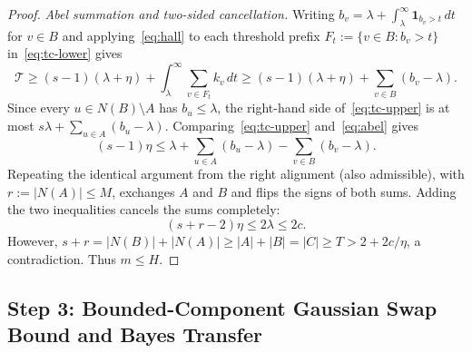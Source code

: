 \documentclass[11pt]{article}
\theoremstyle{plain}
\theoremstyle{definition}
\theoremstyle{remark}
\begin{document}
\begin{proof}
\emph{Abel summation and two-sided cancellation.}
Writing $b_v = \lambda + \int_\lambda^\infty \mathbf{1}_{b_v > t}\,dt$ for $v \in B$ and applying~\eqref{eq:hall} to each threshold prefix $F_t := \{v \in B : b_v > t\}$ in~\eqref{eq:tc-lower} gives
\begin{equation}\label{eq:abel}
\mathcal{T}
\ge (s - 1)(\lambda + \eta) + \int_\lambda^\infty \sum_{v \in F_t} k_v\,dt
\ge (s - 1)(\lambda + \eta) + \sum_{v \in B} (b_v - \lambda).
\end{equation}
Since every $u \in N(B) \setminus A$ has $b_u \le \lambda$, the right-hand side of~\eqref{eq:tc-upper} is at most $s\lambda + \sum_{u \in A}(b_u - \lambda)$.
Comparing~\eqref{eq:tc-upper} and~\eqref{eq:abel} gives
\[
(s - 1)\eta \le \lambda + \sum_{u \in A}(b_u - \lambda) - \sum_{v \in B}(b_v - \lambda).
\]
Repeating the identical argument from the right alignment (also admissible), with $r := |N(A)| \le M$, exchanges $A$ and $B$ and flips the signs of both sums.
Adding the two inequalities cancels the sums completely:
\[
(s + r - 2)\eta \le 2\lambda \le 2c.
\]
However, $s + r = |N(B)| + |N(A)| \ge |A| + |B| = |C| \ge T > 2 + 2c/\eta$, a contradiction.
Thus $m \le H$.
\end{proof}

\subsection{Step 3: Bounded-Component Gaussian Swap Bound and Bayes Transfer}
\end{document}
